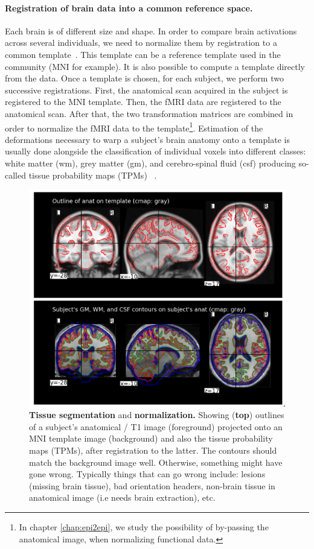 \paragraph{Registration of brain data into a common reference space.}
Each brain is of different size
and shape. In order to compare brain activations across several individuals, we
need to normalize them by registration to a common template~\citep{fristonbook,ashburner2005,ashburner2007,pmid19195496}. This template
can be a reference template used in the community (MNI for example). It is
also possible to compute a template directly from the data. Once a template
is chosen, for each subject, we perform two successive registrations. First,
the anatomical scan acquired in the subject is registered to the MNI template.
Then, the fMRI data are registered to the anatomical scan. After that, the two
transformation matrices are combined in order to normalize the fMRI data to
the template\footnote{In chapter \ref{chap:epi2epi}, we study the possibility of by-passing the anatomical image, when normalizing functional data.}. Estimation of the deformations necessary to warp a subject's brain anatomy onto a template is usually done alongside the classification of individual voxels into different classes: white matter (wm), grey matter (gm), and cerebro-spinal fluid (csf) producing so-called tissue probability maps (TPMs) ~\citep{ashburner2005}.

\begin{figure}
  \includegraphics[width=1\linewidth]{figures/normalize.png}
  \caption{\textbf{Tissue segmentation} and \textbf{normalization.} Showing (\textbf{top}) outlines of a subject's anatomical / T1 image (foreground) projected onto an MNI template image (background) and also the tissue probability maps (TPMs), after registration to the latter. The contours should match the background image well. Otherwise, something might have gone wrong.
    Typically things that can go wrong include:
    lesions (missing brain tissue), bad orientation headers,
non-brain tissue in anatomical image (i.e needs brain
extraction), etc.}
\end{figure}

